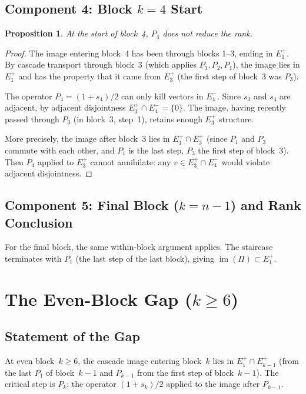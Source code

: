 \documentclass[11pt]{article}
\newtheorem{proposition}[theorem]{Proposition}
\theoremstyle{definition}
\theoremstyle{remark}
\newcommand{\im}{\operatorname{im}}
\begin{document}
\subsection{Component 4: Block $k = 4$ Start}

\begin{proposition}
At the start of block~4, $P_4$ does not reduce the rank.
\end{proposition}

\begin{proof}
The image entering block~4 has been through blocks 1--3, ending in $E_1^+$.
By cascade transport through block~3 (which applies $P_3, P_2, P_1$), the
image lies in $E_1^+$ and has the property that it came from $E_3^+$
(the first step of block~3 was $P_3$).

The operator $P_4 = (1+s_4)/2$ can only kill vectors in $E_4^-$.
Since $s_3$ and $s_4$ are adjacent, by adjacent disjointness
$E_3^+ \cap E_4^- = \{0\}$. The image, having recently passed through
$P_3$ (in block~3, step~1), retains enough $E_3^+$ structure.

More precisely, the image after block~3 lies in $E_1^+ \cap E_3^+$
(since $P_1$ and $P_3$ commute with each other, and $P_1$ is the last
step, $P_3$ the first step of block~3). Then $P_4$ applied to
$E_3^+$ cannot annihilate: any $v \in E_3^+ \cap E_4^-$ would violate
adjacent disjointness.
\end{proof}

\subsection{Component 5: Final Block ($k = n{-}1$) and Rank Conclusion}

For the final block, the same within-block argument applies.
The staircase terminates with $P_1$ (the last step of the last block),
giving $\im(\Pi) \subset E_1^+$.

\section{The Even-Block Gap ($k \geq 6$)}

\subsection{Statement of the Gap}

At even block~$k \geq 6$, the cascade image entering block~$k$ lies in
$E_1^+ \cap E_{k-1}^+$ (from the last $P_1$ of block~$k{-}1$ and
$P_{k-1}$ from the first step of block~$k{-}1$). The critical step
is $P_k$: the operator $(1+s_k)/2$ applied to the image after $P_{k-1}$.
\end{document}
